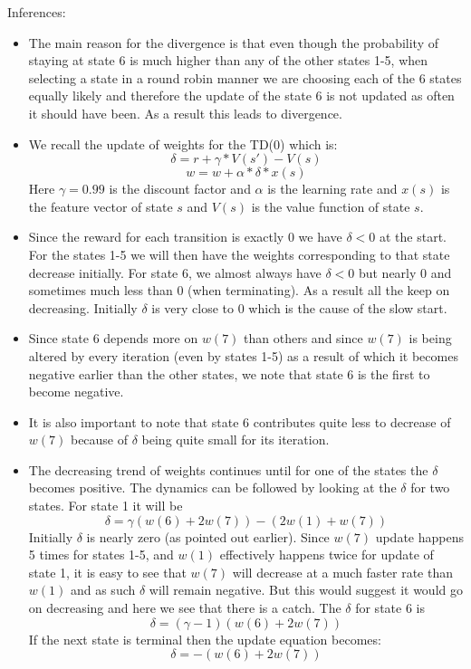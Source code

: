 \documentclass{article}
\begin{document}
Inferences:
\begin{itemize}
\item The main reason for the divergence is that even though the probability of staying at state 6 is much higher than any of the other states 1-5, when selecting a state in a round robin manner we are choosing each of the 6 states equally likely and therefore the update of the state 6 is not updated as often it should have been. As a result this leads to divergence.
\item We recall the update of weights for the TD(0) which is:
  $$\delta = r + \gamma * V(s') - V(s)$$
  $$w = w + \alpha * \delta * x(s)$$
  Here $\gamma=0.99$ is the discount factor and $\alpha$ is the learning rate and $x(s)$ is the feature vector of state $s$ and $V(s)$ is the value function of state $s$.
\item Since the reward for each transition is exactly $0$ we have $\delta < 0$ at the start. For the states 1-5 we will then have the weights corresponding to that state decrease initially. For state 6, we almost always have $\delta < 0$ but nearly 0 and sometimes much less than 0 (when terminating). As a result all the keep on decreasing. Initially $\delta$ is very close to 0 which is the cause of the slow start.
\item Since state 6 depends more on $w(7)$ than others and since $w(7)$ is being altered by every iteration (even by states 1-5) as a result of which it becomes negative earlier than the other states, we note that state 6 is the first to become negative.
\item It is also important to note that state 6 contributes quite less to decrease of $w(7)$ because of $\delta$ being quite small for its iteration.
\item The decreasing trend of weights continues until for one of the states the $\delta$ becomes positive. The dynamics can be followed by looking at the $\delta$ for two states. For state 1 it will be
  $$\delta = \gamma ( w(6) + 2 w(7)) - (2w(1) + w(7))$$
  Initially $\delta$ is nearly zero (as pointed out earlier). Since $w(7)$ update happens 5 times for states 1-5, and $w(1)$ effectively happens twice for update of state 1, it is easy to see that $w(7)$ will decrease at a much faster rate than $w(1)$ and as such $\delta$ will remain negative. But this would suggest it would go on decreasing and here we see that there is a catch. The $\delta$ for state 6 is
  $$\delta = (\gamma - 1)(w(6) + 2w(7))$$
  If the next state is terminal then the update equation becomes:
  $$\delta = -(w(6) + 2w(7))$$

\end{itemize}
\end{document}
